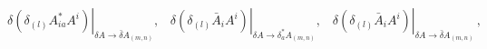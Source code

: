 \begin{equation*}
\left. \delta (\delta _{(l)}A_{ia}^{\ast }A^{i})\right| _{\delta
A\rightarrow \bar{\delta}A_{(m,n)}},\;\;\;\left. \delta (\delta _{(l)}\bar{A}%
_{i}A^{i})\right| _{\delta A\rightarrow \delta _{a}^{\ast
}A_{(m,n)}},\;\;\;\left. \delta (\delta _{(l)}\bar{A}_{i}A^{i})\right|
_{\delta A\rightarrow \bar{\delta}A_{(m,n)}}\,,
\end{equation*}

